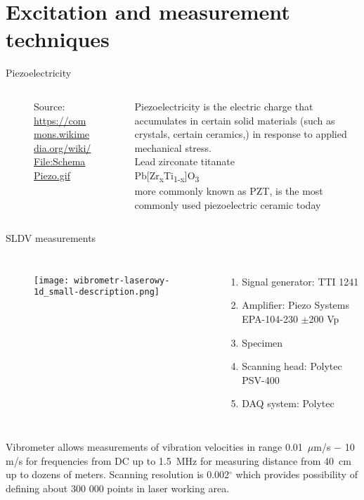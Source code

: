 \documentclass[10pt,aspectratio=169]{beamer} %
\begin{document}
\section{Excitation and measurement techniques}
\begin{frame}{Piezoelectricity}
	\begin{columns}[T]
		\begin{column}{0.5\textwidth}
			\begin{figure}
				\caption{Source: \url{https://commons.wikimedia.org/wiki/File:SchemaPiezo.gif }}
			\end{figure}
		\end{column}
		\begin{column}{0.5\textwidth}
		Piezoelectricity is the electric charge that accumulates in certain solid materials (such as crystals, certain ceramics,) in response to applied mechanical stress.	\\
		Lead zirconate titanate\\
		Pb[Zr\textsubscript{x}Ti\textsubscript{1-x}]O\textsubscript{3} \\
		 more commonly known as PZT, is the most commonly used piezoelectric ceramic today
		\end{column}
	\end{columns}		
\end{frame}
\note{
}
\begin{frame}[t]{SLDV measurements}
	\begin{columns}[T]
		\begin{figure}
			\texttt{[image: wibrometr-laserowy-1d\_small-description.png]}
		\end{figure}
		\begin{enumerate}
			\item Signal generator: TTI 1241 
			\item Amplifier: Piezo Systems EPA-104-230 $\pm$200 Vp
			\item Specimen
			\item Scanning head: Polytec PSV-400
			\item DAQ system: Polytec
		\end{enumerate}
	\end{columns}
	{\small
		Vibrometer allows measurements of vibration velocities in range 0.01~$\mu$m/s $-$ 10 m/s for frequencies from DC up to 1.5~MHz for measuring distance from 40~cm up to dozens of meters. Scanning resolution is 0.002$^{\circ}$  which provides possibility of defining about 300 000 points in laser working area.}
\end{frame}
\end{document}
